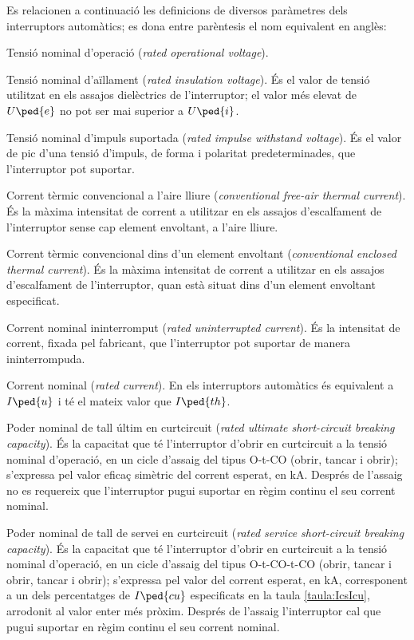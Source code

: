 Es relacionen a continuació les definicions de diversos paràmetres dels interruptors automàtics; es dona entre parèntesis el nom equivalent en anglès:
\begin{list}{}
	{\setlength{\labelwidth}{10mm} \setlength{\leftmargin}{15mm} \setlength{\labelsep}{5mm}}
	\item[$U\ped{e}$] Tensió nominal d'operació (\textit{rated operational voltage}).
	\item[$U\ped{i}$] Tensió nominal d'aïllament (\textit{rated insulation voltage}). És el valor de tensió utilitzat en els assajos dielèctrics de l'interruptor;  el valor més elevat de $U\ped{e}$ no pot ser mai superior a $U\ped{i}$.
	\item[$U\ped{imp}$] Tensió nominal d'impuls suportada (\textit{rated impulse withstand voltage}). És el valor de pic d'una tensió d'impuls, de forma i polaritat predeterminades, que l'interruptor pot suportar.
	\item[$I\ped{th}$] Corrent tèrmic convencional a l'aire lliure (\textit{conventional free-air thermal current}).  És la  màxima intensitat de corrent a utilitzar en els assajos d'escalfament de l'interruptor sense cap element envoltant, a l'aire lliure.
	\item[$I\ped{the}$] Corrent tèrmic convencional dins d'un element envoltant (\textit{conventional enclosed thermal current}).  És la màxima intensitat de corrent a utilitzar en els assajos d'escalfament de l'interruptor, quan està situat dins d'un element envoltant especificat.
	\item[$I\ped{u}$] Corrent nominal ininterromput (\textit{rated uninterrupted current}).  És la intensitat  de corrent, fixada pel fabricant, que l'interruptor pot suportar de manera ininterrompuda.
	\item[$I\ped{n}$] Corrent nominal (\textit{rated current}).  En els interruptors automàtics és equivalent a $I\ped{u}$ i té el mateix valor que $I\ped{th}$.
	\item[$I\ped{cu}$] Poder nominal de tall últim en curtcircuit (\textit{rated ultimate  short-circuit breaking capacity}). És la capacitat que té l'interruptor d'obrir en curtcircuit a la tensió nominal d'operació, en un cicle d'assaig del tipus O-t-CO (obrir, tancar i obrir); s'expressa pel valor eficaç simètric del corrent esperat, en kA. Després de l'assaig no es requereix que l'interruptor pugui suportar en règim continu el seu corrent nominal.
	\item[$I\ped{cs}$] Poder nominal de tall de servei en curtcircuit (\textit{rated service  short-circuit breaking capacity}). És la capacitat que té l'interruptor d'obrir en curtcircuit a la tensió nominal d'operació, en un cicle d'assaig del tipus O-t-CO-t-CO (obrir, tancar i obrir, tancar i obrir); s'expressa pel valor  del corrent esperat, en kA, corresponent a un dels percentatges de $I\ped{cu}$ especificats en la taula \vref{taula:IcsIcu}, arrodonit al valor enter més pròxim. Després de l'assaig l'interruptor cal que pugui suportar en règim continu  el seu corrent nominal.
	

\end{list}
